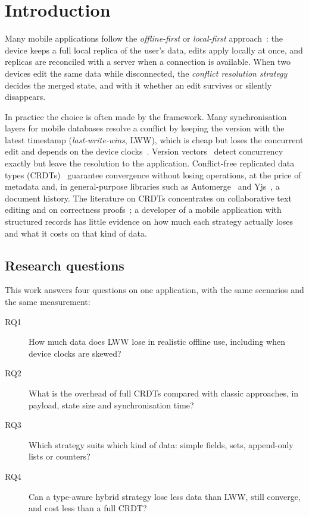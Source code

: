 \section{Introduction}\label{sec:intro}

Many mobile applications follow the \emph{offline-first} or \emph{local-first}
approach~\cite{kleppmann2019localfirst}: the device keeps a full local replica of the user's data, edits apply
locally at once, and replicas are reconciled with a server when a connection is available. When two devices edit the
same data while disconnected, the \emph{conflict resolution strategy} decides the merged state, and with it whether
an edit survives or silently disappears.

In practice the choice is often made by the framework. Many synchronisation layers for mobile databases resolve a
conflict by keeping the version with the latest timestamp (\emph{last-write-wins}, LWW), which is cheap but loses
the concurrent edit and depends on the device clocks~\cite{kleppmann2017ddia}. Version vectors~\cite{parker1983detection}
detect concurrency exactly but leave the resolution to the application. Conflict-free replicated data types
(CRDTs)~\cite{shapiro2011crdt} guarantee convergence without losing operations, at the price of metadata and, in
general-purpose libraries such as Automerge~\cite{automergedocs} and Yjs~\cite{yjsdocs}, a document history. The
literature on CRDTs concentrates on collaborative text editing and on correctness
proofs~\cite{attiya2016editing,gomes2017verifying}; a developer of a mobile application with structured records has
little evidence on how much each strategy actually loses and what it costs on that kind of data.

\subsection{Research questions}
This work answers four questions on one application, with the same scenarios and the same measurement:
\begin{description}
\item[RQ1] How much data does LWW lose in realistic offline use, including when device clocks are skewed?
\item[RQ2] What is the overhead of full CRDTs compared with classic approaches, in payload, state size and
  synchronisation time?
\item[RQ3] Which strategy suits which kind of data: simple fields, sets, append-only lists or counters?
\item[RQ4] Can a type-aware hybrid strategy lose less data than LWW, still converge, and cost less than a full CRDT?
\end{description}

